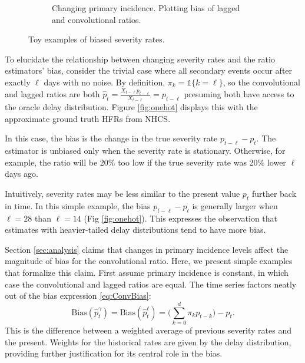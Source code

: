 \documentclass{article}
\begin{document}
\begin{figure}
\begin{subfigure}[b]{0.45\linewidth}
         \caption{Changing primary incidence. Plotting bias of lagged and convolutional ratios.}
         \label{fig:chging_primary}
     \end{subfigure}
        \caption{Toy examples of biased severity rates.}
        \label{fig:bias_ex}
\end{figure}


To elucidate the relationship between changing severity rates and the ratio estimators' bias, consider the trivial case where all secondary events occur after exactly $\ell$ days with no noise. By definition, $\pi_k = \mathds{1}\{k=\ell\}$, so the convolutional and lagged ratios are both $\hat{p}_t = \frac{X_{t-\ell}p_{t-\ell}}{X_{t-\ell}} = p_{t-\ell}$ presuming both have access to the oracle delay distribution. Figure \ref{fig:onehot} displays this with the approximate ground truth HFRs from NHCS. 

In this case, the bias is the change in the true severity rate $p_{t-\ell} - p_t$. The estimator is unbiased only when the severity rate is stationary. Otherwise, for example, the ratio will be 20\% too low if the true severity rate was 20\% lower $\ell$ days ago. 

Intuitively, severity rates may be less similar to the present value $p_t$ further back in time. In this simple example, the bias $p_{t-\ell}-p_t$ is generally larger when $\ell=28$ than $\ell=14$ (Fig \ref{fig:onehot}). This expresses the observation that estimates with heavier-tailed delay distributions tend to have more bias. 


Section \ref{sec:analysis} claims that changes in primary incidence levels affect the magnitude of bias for the convolutional ratio. Here, we present simple examples that formalize this claim. First assume primary incidence is constant, in which case the convolutional and lagged ratios are equal. The time series factors neatly out of the bias expression  \ref{eq:ConvBias}:
$$\text{Bias}(\hat{p}_t^{\gamma}) = \text{Bias}(\hat{p}_t^\ell) = \Big(\sum_{k=0}^d \pi_k p_{t-k}\Big)-p_t.$$
\noindent This is the difference between a weighted average of previous severity rates and the present. Weights for the historical rates are given by the delay distribution, providing further justification for its central role in the bias. 
\end{document}
